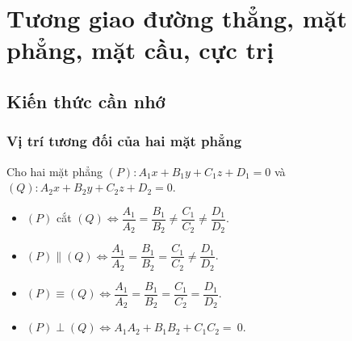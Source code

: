 \section{Tương giao đường thẳng, mặt phẳng, mặt cầu, cực trị}
\subsection{Kiến thức cần nhớ}
\begin{khung}
\subsubsection{Vị trí tương đối của hai mặt phẳng}
	Cho hai mặt phẳng $(P)\colon A_1x+B_1y+C_1z+D_1=0$ và $(Q)\colon A_2x+B_2y+C_2z+D_2=0$.
	\begin{multicols}{2}
		\begin{itemize}
			\item $(P)$ cắt $(Q)\Leftrightarrow \dfrac{A_1}{A_2}=\dfrac{B_1}{B_2}\neq \dfrac{C_1}{C_2}\neq \dfrac{D_1}{D_2}$.
			\item $(P)\parallel(Q)\Leftrightarrow \dfrac{A_1}{A_2}=\dfrac{B_1}{B_2}= \dfrac{C_1}{C_2}\neq \dfrac{D_1}{D_2}$.
			\item $(P)\equiv (Q)\Leftrightarrow \dfrac{A_1}{A_2}=\dfrac{B_1}{B_2}= \dfrac{C_1}{C_2}=\dfrac{D_1}{D_2}$.
			\item $(P)\perp (Q)\Leftrightarrow A_1A_2+B_1B_2+C_1C_2=~0$.
		\end{itemize}
	\end{multicols}

\end{khung}
